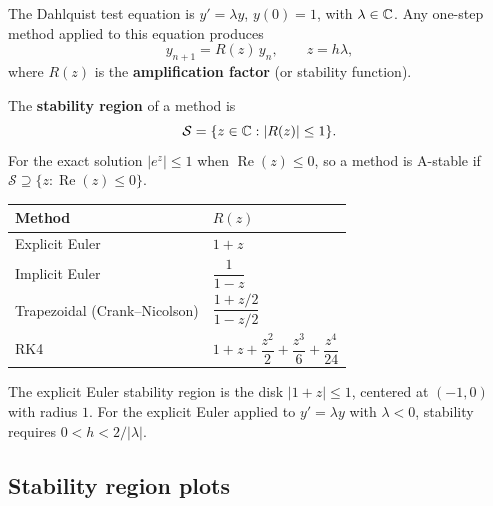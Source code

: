 \begin{definition}
\label{def:test-equation}
The Dahlquist test equation is $y' = \lambda y$, $y(0) = 1$, with $\lambda \in \mathbb{C}$. Any one-step method applied to this equation produces
\[
    y_{n+1} = R(z)\,y_n, \qquad z = h\lambda,
\]
where $R(z)$ is the \textbf{amplification factor} (or stability function).
\end{definition}

\begin{definition}
\label{def:stability-region}
The \textbf{stability region} of a method is
\[
    \mathcal{S} = \{z \in \mathbb{C} : |R(z)| \leq 1\}.
\]
For the exact solution $|e^{z}| \leq 1$ when $\operatorname{Re}(z) \leq 0$, so a method is A-stable if $\mathcal{S} \supseteq \{z : \operatorname{Re}(z) \leq 0\}$.
\end{definition}

\begin{proposition}
\label{prop:amplification}
\begin{center}
\begin{tabular}{ll}
    \toprule
    \textbf{Method} & $R(z)$ \\
    \midrule
    Explicit Euler  & $1 + z$ \\
    Implicit Euler  & $\dfrac{1}{1-z}$ \\
    Trapezoidal (Crank--Nicolson) & $\dfrac{1+z/2}{1-z/2}$ \\
    RK4             & $1 + z + \dfrac{z^2}{2} + \dfrac{z^3}{6} + \dfrac{z^4}{24}$ \\
    \bottomrule
\end{tabular}
\end{center}
\end{proposition}

\begin{remark}
The explicit Euler stability region is the disk $|1+z| \leq 1$, centered at $(-1,0)$ with radius $1$. For the explicit Euler applied to $y' = \lambda y$ with $\lambda < 0$, stability requires $0 < h < 2/|\lambda|$.
\end{remark}

\subsection{Stability region plots}

